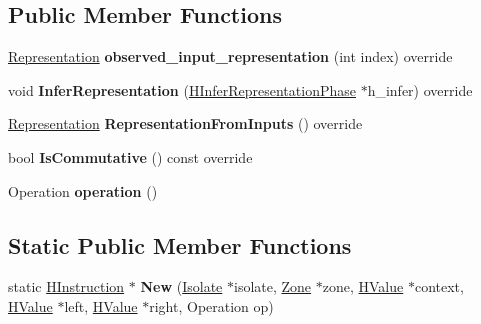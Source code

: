 \subsection*{Public Member Functions}
\begin{DoxyCompactItemize}
\item 
\hyperlink{classv8_1_1internal_1_1_representation}{Representation} {\bfseries observed\+\_\+input\+\_\+representation} (int index) override\hypertarget{classv8_1_1internal_1_1_h_math_min_max_a1a7a60aa05b5e58c48f2c4e6a90dc654}{}\label{classv8_1_1internal_1_1_h_math_min_max_a1a7a60aa05b5e58c48f2c4e6a90dc654}

\item 
void {\bfseries Infer\+Representation} (\hyperlink{classv8_1_1internal_1_1_h_infer_representation_phase}{H\+Infer\+Representation\+Phase} $\ast$h\+\_\+infer) override\hypertarget{classv8_1_1internal_1_1_h_math_min_max_a9ae7e837092da9458ffcdc1ab9ce420b}{}\label{classv8_1_1internal_1_1_h_math_min_max_a9ae7e837092da9458ffcdc1ab9ce420b}

\item 
\hyperlink{classv8_1_1internal_1_1_representation}{Representation} {\bfseries Representation\+From\+Inputs} () override\hypertarget{classv8_1_1internal_1_1_h_math_min_max_a5ea16e446a6ce1dcaf28e629246efa81}{}\label{classv8_1_1internal_1_1_h_math_min_max_a5ea16e446a6ce1dcaf28e629246efa81}

\item 
bool {\bfseries Is\+Commutative} () const  override\hypertarget{classv8_1_1internal_1_1_h_math_min_max_a8d680fc8868ea518066afc7c6fefa3a1}{}\label{classv8_1_1internal_1_1_h_math_min_max_a8d680fc8868ea518066afc7c6fefa3a1}

\item 
Operation {\bfseries operation} ()\hypertarget{classv8_1_1internal_1_1_h_math_min_max_a47b5f6bfc3195bdd97d3784a67109d7d}{}\label{classv8_1_1internal_1_1_h_math_min_max_a47b5f6bfc3195bdd97d3784a67109d7d}

\end{DoxyCompactItemize}
\subsection*{Static Public Member Functions}
\begin{DoxyCompactItemize}
\item 
static \hyperlink{classv8_1_1internal_1_1_h_instruction}{H\+Instruction} $\ast$ {\bfseries New} (\hyperlink{classv8_1_1internal_1_1_isolate}{Isolate} $\ast$isolate, \hyperlink{classv8_1_1internal_1_1_zone}{Zone} $\ast$zone, \hyperlink{classv8_1_1internal_1_1_h_value}{H\+Value} $\ast$context, \hyperlink{classv8_1_1internal_1_1_h_value}{H\+Value} $\ast$left, \hyperlink{classv8_1_1internal_1_1_h_value}{H\+Value} $\ast$right, Operation op)\hypertarget{classv8_1_1internal_1_1_h_math_min_max_a348cf0f60b2aab3f628c013d2944b8d1}{}\label{classv8_1_1internal_1_1_h_math_min_max_a348cf0f60b2aab3f628c013d2944b8d1}

\end{DoxyCompactItemize}
